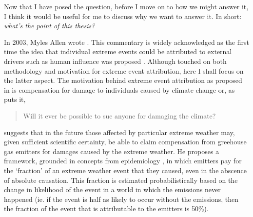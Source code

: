   Now that I have posed the question, before I move on to how we might answer it, I think it would be useful for me to discuss why we want to answer it. In short: \emph{what's the point of this thesis?}

  In 2003, Myles Allen wrote  \citep{allen_liability_2003}. This commentary is widely acknowledged as the first time the idea that individual extreme events could be attributed to external drivers such as human influence was proposed \citep{otto_attribution_2017}. Although \citeauthor{allen_liability_2003} touched on both methodology and motivation for extreme event attribution, here I shall focus on the latter aspect. The motivation behind extreme event attribution as proposed in  is compensation for damage to individuals caused by climate change or, as \citeauthor{allen_liability_2003} puts it, 
  \begin{quote}
    Will it ever be possible to sue anyone for damaging the climate?
  \end{quote}
  \citeauthor{allen_liability_2003} suggests that in the future those affected by particular extreme weather may, given sufficient scientific certainty, be able to claim compensation from greehouse gas emitters for damages caused by the extreme weather. He proposes a framework, grounded in concepts from epidemiology \citep{stone_end--end_2005}, in which emitters pay for the `fraction' of an extreme weather event that they caused, even in the abscence of absolute causation. This fraction is estimated probabilistically based on the change in likelihood of the event in a world in which the emissions never happened (ie. if the event is half as likely to occur without the emissions, then the fraction of the event that is attributable to the emitters is 50\%).
